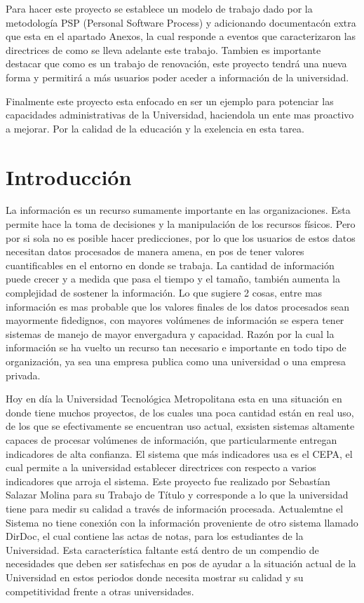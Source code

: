 \documentclass[a4paper,12pt,openany,oneside]{book}
\begin{document}
Para hacer este proyecto se establece un modelo de trabajo dado por la metodología PSP (Personal Software Process) y adicionando documentacón extra que esta en el apartado Anexos, la cual responde a eventos que caracterizaron las directrices de como se lleva adelante este trabajo. Tambien es importante destacar que como es un trabajo de renovación, este proyecto tendrá una nueva forma y permitirá a más usuarios poder aceder a información de la universidad.

Finalmente este proyecto esta enfocado en ser un ejemplo para potenciar las capacidades administrativas de la Universidad, haciendola un ente mas proactivo a mejorar. Por la calidad de la educación y la exelencia en esta tarea.
\tableofcontents
\listoffigures
\chapter*{Introducción}
\thispagestyle{empty}
La información es un recurso sumamente importante en las organizaciones. Esta permite hace la toma de decisiones y la manipulación de los recursos físicos. Pero por si sola no es posible hacer predicciones, por lo que los usuarios de estos datos necesitan datos procesados de manera amena, en pos de tener valores cuantificables en el entorno en donde se trabaja. La cantidad de información puede crecer y a medida que pasa el tiempo y el tamaño, también aumenta la complejidad de sostener la información. Lo que sugiere 2 cosas, entre mas información es mas probable que los valores finales de los datos procesados sean mayormente fidedignos, con mayores volúmenes de información se espera tener sistemas de manejo de mayor envergadura y capacidad. Razón por la cual la información se ha vuelto un recurso tan necesario e importante en todo tipo de organización, ya sea una empresa publica como una universidad o una empresa privada.

Hoy en día la Universidad Tecnológica Metropolitana esta en una situación en donde tiene muchos proyectos, de los cuales una poca cantidad están en real uso, de los que se efectivamente se encuentran uso actual, exsisten sistemas altamente capaces de procesar volúmenes de información, que particularmente entregan indicadores de alta confianza. El sistema que más indicadores usa es el CEPA, el cual permite a la universidad establecer directrices con respecto a varios indicadores que arroja el sistema. Este proyecto fue realizado por Sebastían Salazar Molina para su Trabajo de Título y corresponde a lo que la universidad tiene para medir su calidad a través de información procesada. Actualemtne el Sistema no tiene conexión con la información proveniente de otro sistema llamado DirDoc, el cual contiene las actas de notas, para los estudiantes de la Universidad. Esta característica faltante está dentro de un compendio de necesidades que deben ser satisfechas en pos de ayudar a la situación actual de la Universidad en estos periodos donde necesita mostrar su calidad y su competitividad frente a otras universidades.
\end{document}
